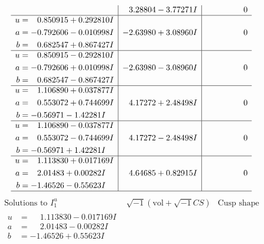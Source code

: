 \documentclass[1p]{elsarticle_modified}
\theoremstyle{definition}
\newcommand{\I}{\sqrt{-1}}
\begin{document}
$$\begin{array}{c|c|c}
 & \phantom{-}3.28804 - 3.77271 I & \phantom{-0.000000 } 0 \\ \hline\begin{aligned}
u &= \phantom{-}0.850915 + 0.292810 I \\
a &= -0.792606 - 0.010998 I \\
b &= \phantom{-}0.682547 + 0.867427 I\end{aligned}
 & -2.63980 + 3.08960 I & \phantom{-0.000000 } 0 \\ \hline\begin{aligned}
u &= \phantom{-}0.850915 - 0.292810 I \\
a &= -0.792606 + 0.010998 I \\
b &= \phantom{-}0.682547 - 0.867427 I\end{aligned}
 & -2.63980 - 3.08960 I & \phantom{-0.000000 } 0 \\ \hline\begin{aligned}
u &= \phantom{-}1.106890 + 0.037877 I \\
a &= \phantom{-}0.553072 + 0.744699 I \\
b &= -0.56971 - 1.42281 I\end{aligned}
 & \phantom{-}4.17272 + 2.48498 I & \phantom{-0.000000 } 0 \\ \hline\begin{aligned}
u &= \phantom{-}1.106890 - 0.037877 I \\
a &= \phantom{-}0.553072 - 0.744699 I \\
b &= -0.56971 + 1.42281 I\end{aligned}
 & \phantom{-}4.17272 - 2.48498 I & \phantom{-0.000000 } 0 \\ \hline\begin{aligned}
u &= \phantom{-}1.113830 + 0.017169 I \\
a &= \phantom{-}2.01483 + 0.00282 I \\
b &= -1.46526 - 0.55623 I\end{aligned}
 & \phantom{-}4.64685 + 0.82915 I & \phantom{-0.000000 } 0\\
 \hline 
 \end{array}$$\newpage$$\begin{array}{c|c|c}  
\text{Solutions to }I^u_{1}& \I (\text{vol} + \sqrt{-1}CS) & \text{Cusp shape}\\
 \hline 
\begin{aligned}
u &= \phantom{-}1.113830 - 0.017169 I \\
a &= \phantom{-}2.01483 - 0.00282 I \\
b &= -1.46526 + 0.55623 I\end{aligned}

\end{array}$$
\end{document}
